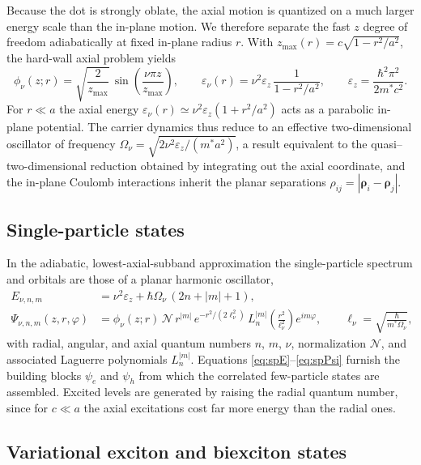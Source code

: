 Because the dot is strongly oblate, the axial motion is quantized on a much
larger energy scale than the in-plane motion. We therefore separate the fast
$z$ degree of freedom adiabatically at fixed in-plane radius $r$. With
$z_{\max}(r)=c\sqrt{1-r^{2}/a^{2}}$, the hard-wall axial problem yields
\begin{equation}
  \phi_\nu(z;r)=\sqrt{\frac{2}{z_{\max}}}\,
  \sin\!\left(\frac{\nu\pi z}{z_{\max}}\right),
  \qquad
  \varepsilon_\nu(r)=\nu^{2}\varepsilon_z\,\frac{1}{1-r^{2}/a^{2}},
  \qquad
  \varepsilon_z=\frac{\hbar^{2}\pi^{2}}{2m^{*}c^{2}} .
  \label{eq:zmotion}
\end{equation}
For $r\ll a$ the axial energy $\varepsilon_\nu(r)\simeq\nu^{2}\varepsilon_z(1+r^{2}/a^{2})$
acts as a parabolic in-plane potential. The carrier dynamics thus reduce to an
effective two-dimensional oscillator of frequency
$\Omega_\nu=\sqrt{2\nu^{2}\varepsilon_z/(m^{*}a^{2})}$, a result equivalent to the
quasi--two-dimensional reduction obtained by integrating out the axial
coordinate, and the in-plane Coulomb interactions inherit the planar separations
$\rho_{ij}=|\boldsymbol\rho_i-\boldsymbol\rho_j|$.

\subsection{Single-particle states}

In the adiabatic, lowest-axial-subband approximation the single-particle
spectrum and orbitals are those of a planar harmonic oscillator,
\begin{align}
  E_{\nu,n,m} &= \nu^{2}\varepsilon_z+\hbar\Omega_\nu\,(2n+|m|+1),
  \label{eq:spE}\\[4pt]
  \Psi_{\nu,n,m}(z,r,\varphi) &= \phi_\nu(z;r)\,
  \mathcal N\,r^{|m|}\,e^{-r^{2}/(2\ell_\nu^{2})}\,
  L_n^{|m|}\!\left(\frac{r^{2}}{\ell_\nu^{2}}\right)e^{im\varphi},
  \qquad \ell_\nu=\sqrt{\frac{\hbar}{m^{*}\Omega_\nu}},
  \label{eq:spPsi}
\end{align}
with radial, angular, and axial quantum numbers $n$, $m$, $\nu$, normalization
$\mathcal N$, and associated Laguerre polynomials $L_n^{|m|}$. Equations
\eqref{eq:spE}--\eqref{eq:spPsi} furnish the building blocks $\psi_e$ and
$\psi_h$ from which the correlated few-particle states are assembled. Excited
levels are generated by raising the radial quantum number, since for $c\ll a$
the axial excitations cost far more energy than the radial ones.

\subsection{Variational exciton and biexciton states}

